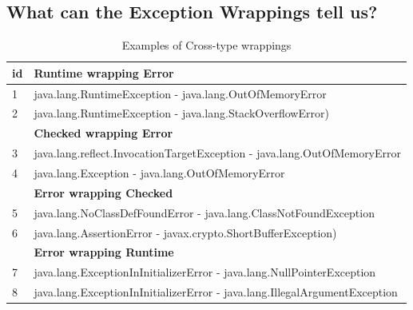 \documentclass[conference]{IEEEtran}
\begin{document}
\noindent {}


\subsection{What can the Exception Wrappings tell us?}


\begin{table}
\centering

\begin{tabular}{ll}
    \hline
 id & \bfseries{Runtime wrapping Error}    \\  %
    \hline
1 & java.lang.RuntimeException - java.lang.OutOfMemoryError  \\ %
2& java.lang.RuntimeException -  java.lang.StackOverflowError)   \\ %
\hline
& \bfseries{Checked wrapping Error}  \\
 \hline
3&java.lang.reflect.InvocationTargetException - java.lang.OutOfMemoryError  \\ %
4&java.lang.Exception - java.lang.OutOfMemoryError   \\ %
\hline
& \bfseries{Error wrapping Checked}  \\
 \hline
5&java.lang.NoClassDefFoundError - java.lang.ClassNotFoundException   \\ %
6&java.lang.AssertionError - javax.crypto.ShortBufferException)   \\ %
\hline
& \bfseries{Error wrapping Runtime}    \\
 \hline
7&java.lang.ExceptionInInitializerError - java.lang.NullPointerException   \\ %
8&java.lang.ExceptionInInitializerError - java.lang.IllegalArgumentException 	 \\ %
 \hline
  \end{tabular}
\caption{Examples of Cross-type wrappings}
\label{tab:exampeswrap}
\end{table}
\end{document}
